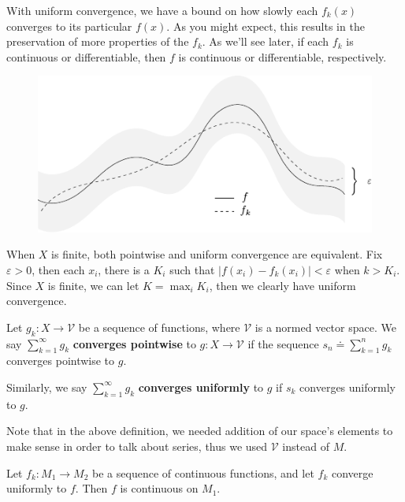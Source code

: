 \documentclass[twoside,10pt]{report}
\begin{document}
With uniform convergence, we have a bound on how slowly each $f_k(x)$ converges to its particular $f(x)$. As you might expect, this results in the preservation of more properties of the $f_k$. As we'll see later, if each $f_k$ is continuous or differentiable, then $f$ is continuous or differentiable, respectively.

\begin{figure}[H]
	\centering
	\includegraphics[scale=1.3]{fig/uniform-convergence.pdf}
\end{figure}

\begin{note}[]
	When $X$ is finite, both pointwise and uniform convergence are equivalent. Fix $\varepsilon>0$, then each $x_i$, there is a $K_i$ such that $|f(x_i) - f_k(x_i) | < \varepsilon$ when $k > K_i$. Since $X$ is finite, we can let $K = \max_i K_i$, then we clearly have uniform convergence.
\end{note}

\begin{defn}[]
	Let $g_k : X \to \mathcal{V}$ be a sequence of functions, where $\mathcal{V}$ is a normed vector space. We say $\sum_{k=1}^{\infty} g_k$ \textbf{converges pointwise} to $g:X \to \mathcal{V}$ if the sequence $s_n \doteq \sum_{k=1}^{n} g_k$ converges pointwise to $g$.

	Similarly, we say $\sum_{k=1}^{\infty} g_k$ \textbf{converges uniformly} to $g$ if $s_k$ converges uniformly to $g$.
\end{defn}

Note that in the above definition, we needed addition of our space's elements to make sense in order to talk about series, thus we used $\mathcal{V}$ instead of $M$.

\begin{prop}
	Let $f_k: M_1 \to M_2$ be a sequence of continuous functions, and let $f_k$ converge uniformly to $f$. Then $f$ is continuous on $M_1$.
\end{prop}
\end{document}
